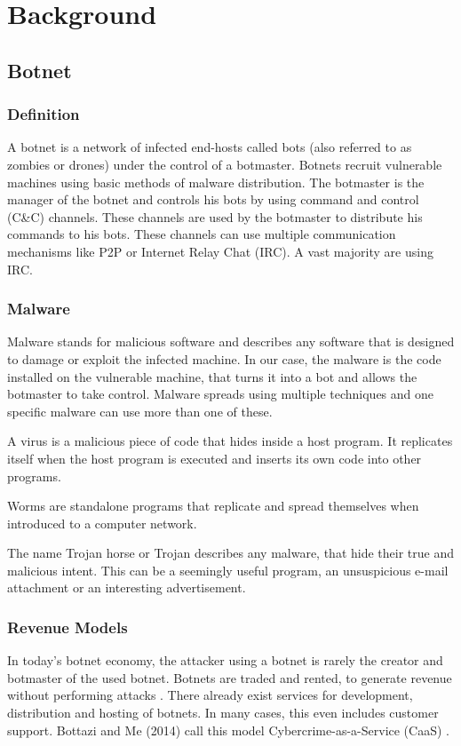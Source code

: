 		
\section{Background}
	\subsection{Botnet}
		\subsubsection{Definition}
			A botnet is a network of infected end-hosts called bots (also referred to as zombies or drones) under the control of a botmaster. Botnets recruit vulnerable machines using basic methods of malware distribution. The botmaster is the manager of the botnet and controls his bots by using command and control (C\&C) channels. These channels are used by the botmaster to distribute his commands to his bots. These channels can use multiple communication mechanisms like P2P or Internet Relay Chat (IRC). A vast majority are using IRC. \cite{AbuRajab06}
			
		\subsubsection{Malware}
Malware stands for malicious software and describes any software that is designed to damage or exploit the infected machine. In our case, the malware is the code installed on the vulnerable machine, that turns it into a bot and allows the botmaster to take control.
Malware spreads using multiple techniques and one specific malware can use more than one of these.

A virus is a malicious piece of code that hides inside a host program. It replicates itself when the host program is executed and inserts its own code into other programs.

Worms are standalone programs that replicate and spread themselves when introduced to a computer network.

The name Trojan horse or Trojan describes any malware, that hide their true and malicious intent. This can be a seemingly useful program, an unsuspicious e-mail attachment or an interesting advertisement.


		\subsubsection{Revenue Models}
In today's botnet economy, the attacker using a botnet is rarely the creator and botmaster of the used botnet. Botnets are traded and rented, to generate revenue without performing attacks \cite{Li09}. There already exist services for development, distribution and hosting of botnets. In many cases, this even includes customer support. Bottazi and Me (2014) call this model Cybercrime-as-a-Service (CaaS) \cite{Bottazzi14}.

